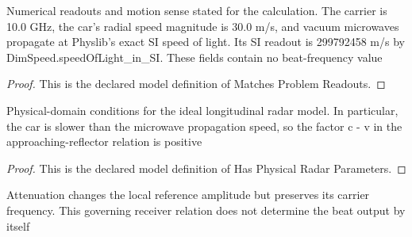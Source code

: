 \begin{definition}
  \label{def:physics:phyx-mini-0525:phyxminiproblems-problemphyxmini0525-matchesproblemreadouts}
  Numerical readouts and motion sense stated for the calculation. The carrier is 10.0 GHz, the car's radial speed magnitude is 30.0 m/s, and vacuum microwaves propagate at Physlib's exact SI speed of light. Its SI readout is 299792458 m/s by DimSpeed.speedOfLight\_in\_SI. These fields contain no beat-frequency value
\end{definition}
\begin{proof}
  This is the declared model definition of Matches Problem Readouts.
\end{proof}
\begin{definition}
  \label{def:physics:phyx-mini-0525:phyxminiproblems-problemphyxmini0525-hasphysicalradarparameters}
  Physical-domain conditions for the ideal longitudinal radar model. In particular, the car is slower than the microwave propagation speed, so the factor c - v in the approaching-reflector relation is positive
\end{definition}
\begin{proof}
  This is the declared model definition of Has Physical Radar Parameters.
\end{proof}
\begin{definition}
  \label{def:physics:phyx-mini-0525:phyxminiproblems-problemphyxmini0525-satisfiesattenuatedreferencelaw}
  Attenuation changes the local reference amplitude but preserves its carrier frequency. This governing receiver relation does not determine the beat output by itself
\end{definition}
